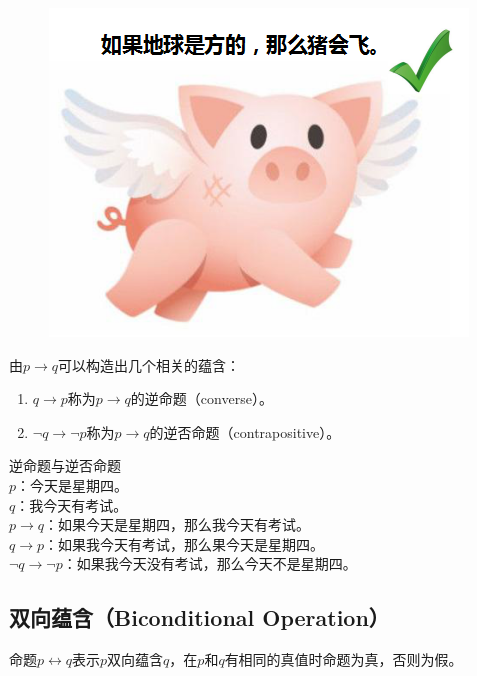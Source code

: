 \documentclass[12pt, openany, oneside]{book}
\begin{document}
\begin{figure}[H]
    \centering
    \includegraphics[scale=0.7]{img/C1/1-2/1.png}
\end{figure}

由$ p \rightarrow q $可以构造出几个相关的蕴含：

\begin{enumerate}
    \item $ q \rightarrow p $称为$ p \rightarrow q $的逆命题（converse）。
    \item $ \neg q \rightarrow \neg p $称为$ p \rightarrow q $的逆否命题（contrapositive）。
\end{enumerate}

\begin{tcolorbox}
    逆命题与逆否命题 \\
    $ p $：今天是星期四。 \\
    $ q $：我今天有考试。 \\
    $ p \rightarrow q $：如果今天是星期四，那么我今天有考试。 \\
    $ q \rightarrow p $：如果我今天有考试，那么果今天是星期四。 \\
    $ \neg q \rightarrow \neg p $：如果我今天没有考试，那么今天不是星期四。
\end{tcolorbox}

\subsection{双向蕴含（Biconditional Operation）}

命题$ p \leftrightarrow q $表示$ p $双向蕴含$ q $，在$ p $和$ q $有相同的真值时命题为真，否则为假。
\end{document}
